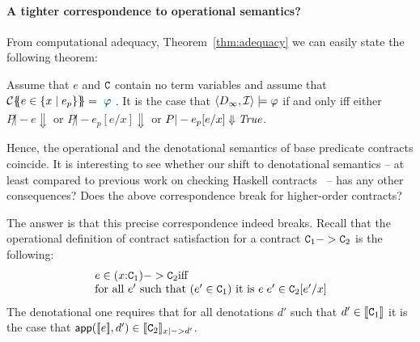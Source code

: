

\paragraph{A tighter correspondence to operational semantics?}

From computational adequacy, Theorem~\ref{thm:adequacy} we can easily state
the following theorem: 
\begin{corollary} Assume that $e$ and $\Ct$ contain no term variables and 
assume that $\ctrans{}{\cdot}{e \in \{x \mid e_p\}} = \formula{\phi}$. It is the case 
that $\langle D_\infty,{\cal I}\rangle \models \phi$ if and only iff either
$P \not|- e \Downarrow$ or $P \not|- e_p[e/x] \Downarrow$ or $P |- e_p[e/x] \Downarrow \True$. \end{corollary}

Hence, the operational and the denotational semantics of base predicate contracts coincide.
It is interesting to see whether our shift to denotational semantics -- at least compared
to previous work on checking Haskell contracts~\cite{xu} -- has any other consequences? Does
the above correspondence break for higher-order contracts?

The answer is that this precise correspondence indeed breaks. 
Recall that the operational definition of contract satisfaction for a contract $\Ct_1 -> \Ct_2$ is the following: 
\[\begin{array}{l} 
   e \in (x{:}\Ct_1) -> \Ct_2 \text{iff} \\
   \text{for all } e' \text{ such that } (e' \in \Ct_1) \text{ it is } e\;e' \in \Ct_2[e'/x]
\end{array}\] 
The denotational one requires that for all denotations $d'$ such that
$d' \in \dbrace{\Ct_1}$ it is the case that 
$\dapp(\dbrace{e},d') \in \dbrace{\Ct_2}_{x |->d'}$. 
 
